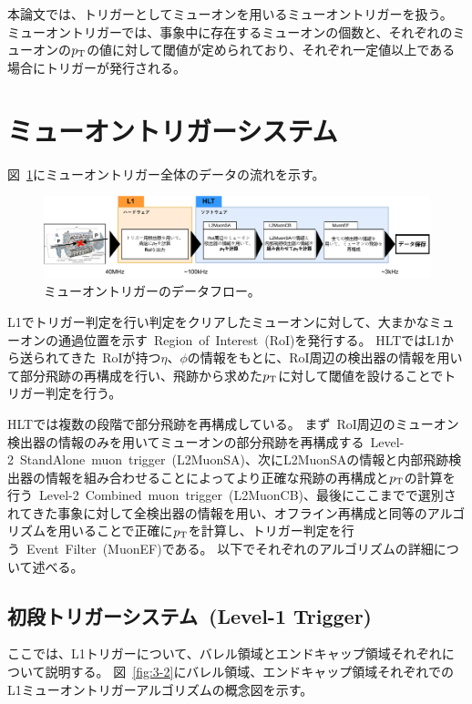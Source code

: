本論文では、トリガーとしてミューオンを用いるミューオントリガーを扱う。
ミューオントリガーでは、事象中に存在するミューオンの個数と、それぞれのミューオンの$p_\mathrm{T}$の値に対して閾値が定められており、それぞれ一定値以上である場合にトリガーが発行される。


\section{ミューオントリガーシステム}\label{chapter3-2}
図~\ref{fig:muonTrigger}にミューオントリガー全体のデータの流れを示す。

\begin{figure}[H]
  \centering
  \includegraphics[clip, width=14cm]{fig/3/muonTrigger.pdf}
  \caption{ミューオントリガーのデータフロー。}
  \label{fig:muonTrigger}
\end{figure}

L1でトリガー判定を行い判定をクリアしたミューオンに対して、大まかなミューオンの通過位置を示す~Region~of~Interest~(RoI)を発行する。
HLTではL1から送られてきた~RoIが持つ$\eta$、$\phi$の情報をもとに、RoI周辺の検出器の情報を用いて部分飛跡の再構成を行い、飛跡から求めた$p_\mathrm{T}$に対して閾値を設けることでトリガー判定を行う。

HLTでは複数の段階で部分飛跡を再構成している。
まず~RoI周辺のミューオン検出器の情報のみを用いてミューオンの部分飛跡を再構成する~Level-2~StandAlone~muon~trigger~(L2MuonSA)、次にL2MuonSAの情報と内部飛跡検出器の情報を組み合わせることによってより正確な飛跡の再構成と$p_\mathrm{T}$の計算を行う~Level-2~Combined~muon~trigger~(L2MuonCB)、最後にここまでで選別されてきた事象に対して全検出器の情報を用い、オフライン再構成と同等のアルゴリズムを用いることで正確に$p_\mathrm{T}$を計算し、トリガー判定を行う~Event~Filter~(MuonEF)である。
以下でそれぞれのアルゴリズムの詳細について述べる。

\subsection{初段トリガーシステム~(Level-1 Trigger)}\label{chapter3-2-1}
ここでは、L1トリガーについて、バレル領域とエンドキャップ領域それぞれについて説明する。
図~\ref{fig:3-2}にバレル領域、エンドキャップ領域それぞれでのL1ミューオントリガーアルゴリズムの概念図を示す。

